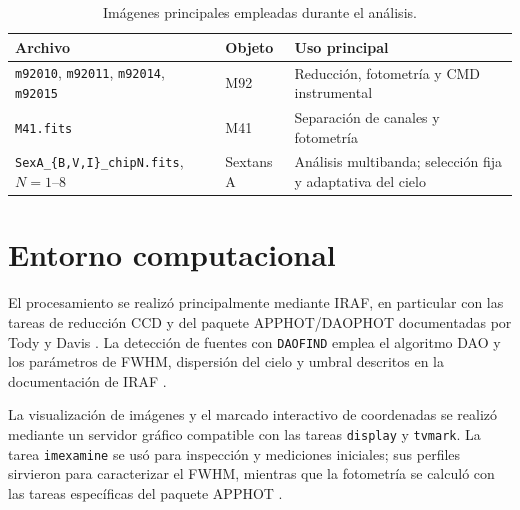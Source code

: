 \documentclass[12pt,letterpaper,oneside]{book}
\begin{document}
\begin{table}[H]

\centering

\small
\begin{tabular}{p{}p{}p{}}

\toprule
Archivo & Objeto & Uso principal \\

\midrule

\texttt{m92010}, \texttt{m92011}, \texttt{m92014}, \texttt{m92015} & M92 & Reducción, fotometría y CMD instrumental \\

\texttt{M41.fits} & M41 & Separación de canales y fotometría \\

\texttt{SexA\_\{B,V,I\}\_chipN.fits}, $N=1$--8 & Sextans A & Análisis multibanda; selección fija y adaptativa del cielo \\

\bottomrule

\end{tabular}

\caption{Imágenes principales empleadas durante el análisis.}

\label{tab:datos}

\end{table}



\section{Entorno computacional}

El procesamiento se realizó principalmente mediante IRAF, en particular con las tareas de reducción CCD y del paquete APPHOT/DAOPHOT documentadas por Tody y Davis \citep{tody1986,davis1989}. La detección de fuentes con \texttt{DAOFIND} emplea el algoritmo DAO y los parámetros de FWHM, dispersión del cielo y umbral descritos en la documentación de IRAF \citep{irafdaofind2026,stetson1987}.

La visualización de imágenes y el marcado interactivo de coordenadas se realizó mediante un servidor gráfico compatible con las tareas \texttt{display} y \texttt{tvmark}. La tarea \texttt{imexamine} se usó para inspección y mediciones iniciales; sus perfiles sirvieron para caracterizar el FWHM, mientras que la fotometría se calculó con las tareas específicas del paquete APPHOT \citep{irafapphot2026}.
\end{document}
